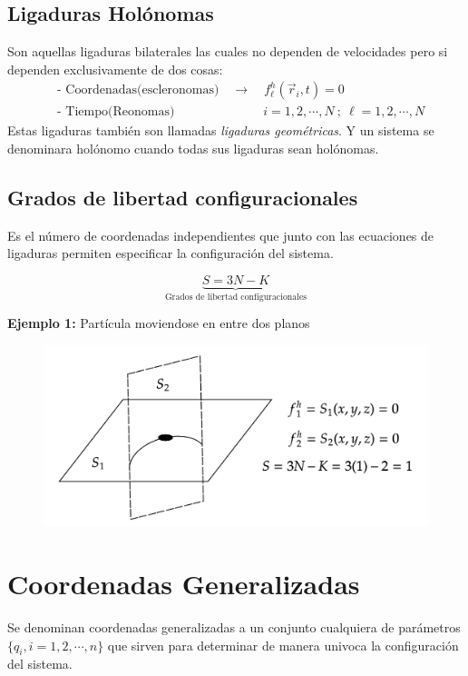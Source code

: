 \documentclass[../main]{subfiles}
\begin{document}
\subsection*{Ligaduras Holónomas}
Son aquellas ligaduras bilaterales las cuales no dependen de velocidades pero si dependen exclusivamente de dos cosas:
\begin{align*}
    &\text{- Coordenadas(escleronomas)} \quad \rightarrow \quad f_{\ell}^h(\vec{r}_i,t)=0 \\
    &\text{- Tiempo(Reonomas)} \qquad \qquad \qquad \quad i=1,2,\cdots, N \ ; \ \ell =1,2,\cdots,N
\end{align*}
Estas ligaduras también son llamadas \textit{ligaduras geométricas}. Y un sistema se denominara holónomo cuando todas sus ligaduras sean holónomas.

\subsection*{Grados de libertad configuracionales}

Es el número de coordenadas independientes que junto con las ecuaciones de ligaduras permiten especificar la configuración del sistema.

\begin{equation}
    \underbrace{S=3N-K}_{\text{Grados de libertad configuracionales}}
    \label{eq44}
\end{equation}

\textbf{Ejemplo 1:} Partícula moviendose en entre dos planos

\begin{figure}[h]
    \centering
    \includegraphics[scale=0.213]{Física Clásica/MECA 2/images/lig6.png}
    \label{fig:fig6}
\end{figure}

\section{Coordenadas Generalizadas}
Se denominan coordenadas generalizadas a un conjunto cualquiera de parámetros $\{ q_i, i=1,2,\cdots,n\}$ que sirven para determinar de manera univoca la configuración del sistema.
\end{document}
